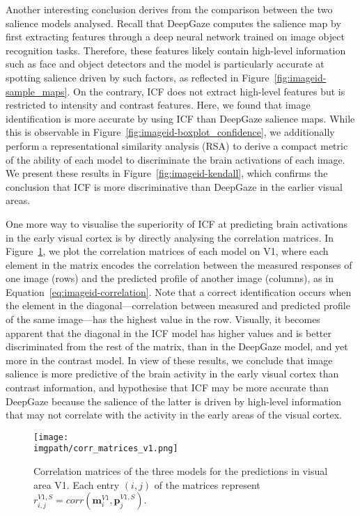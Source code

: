 {Another interesting conclusion derives from the comparison between the two salience models analysed. Recall that DeepGaze computes the salience map by first extracting features through a deep neural network trained on image object recognition tasks. Therefore, these features likely contain high-level information such as face and object detectors and the model is particularly accurate at spotting salience driven by such factors, as reflected in Figure~\ref{fig:imageid-sample_maps}. On the contrary, ICF does not extract high-level features but is restricted to intensity and contrast features. Here, we found that image identification is more accurate by using ICF than DeepGaze salience maps. While this is observable in Figure~\ref{fig:imageid-boxplot_confidence}, we additionally perform a representational similarity analysis (RSA) to derive a compact metric of the ability of each model to discriminate the brain activations of each image. We present these results in Figure~\ref{fig:imageid-kendall}, which confirms the conclusion that ICF is more discriminative than DeepGaze in the earlier visual areas.

One more way to visualise the superiority of ICF at predicting brain activations in the early visual cortex is by directly analysing the correlation matrices. In Figure~\ref{fig:imageid-corr}, we plot the correlation matrices of each model on V1, where each element in the matrix encodes the correlation between the measured responses of one image (rows) and the predicted profile of another image (columns), as in Equation~\ref{eq:imageid-correlation}. Note that a correct identification occurs when the element in the diagonal---correlation between measured and predicted profile of the same image---has the highest value in the row. Visually, it becomes apparent that the diagonal in the ICF model has higher values and is better discriminated from the rest of the matrix, than in the DeepGaze model, and yet more in the contrast model. In view of these results, we conclude that image salience is more predictive of the brain activity in the early visual cortex than contrast information, and hypothesise that ICF may be more accurate than DeepGaze because the salience of the latter is driven by high-level information that may not correlate with the activity in the early areas of the visual cortex.

\begin{figure}[htb]
  \begin{center}
    \texttt{[image: \\imgpath/corr\_matrices\_v1.png]}
  \end{center}
  \caption{Correlation matrices of the three models for the predictions in visual area V1. Each entry $(i, j)$ of the matrices represent $r_{i, j}^{V1, S} = corr(\mathbf{m}_{i}^{V1}, \mathbf{p}_{j}^{V1, S})$.}
\label{fig:imageid-corr}
\end{figure}

}

